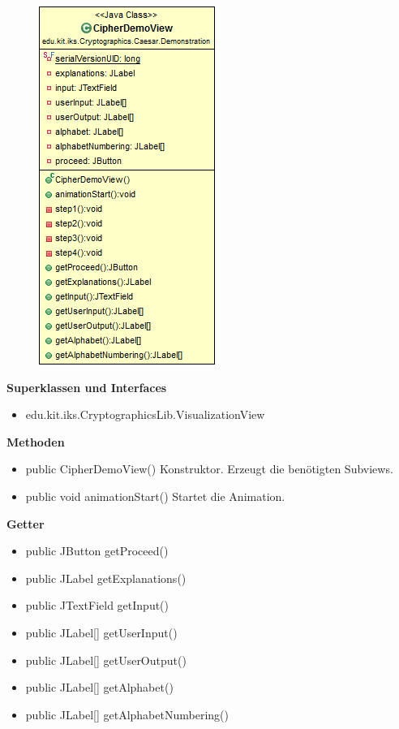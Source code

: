 \documentclass{article}
\begin{document}
      \begin{figure}[H]
        \centering
        \includegraphics{resources/edu-kit-iks-Cryptographics-Caesar-Demonstration-CipherDemoView}
      \end{figure}

      \textbf{Superklassen und Interfaces}
      \begin{itemize}
        \item edu.kit.iks.CryptographicsLib.VisualizationView
      \end{itemize}

      \textbf{Methoden}
      \begin{itemize}
        \item public CipherDemoView() \newline
        Konstruktor. Erzeugt die benötigten Subviews.
        \item public void animationStart() \newline
        Startet die Animation.
      \end{itemize}

      \textbf{Getter}
      \begin{itemize}
        \item public JButton getProceed()
        \item public JLabel getExplanations()
        \item public JTextField getInput()
        \item public JLabel[] getUserInput()
        \item public JLabel[] getUserOutput()
        \item public JLabel[] getAlphabet()
        \item public JLabel[] getAlphabetNumbering()
      \end{itemize}
\end{document}
